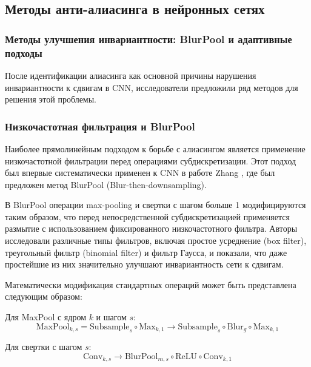 \subsection{Методы анти-алиасинга в нейронных сетях}
\label{sec:antialias}

\subsubsection{Методы улучшения инвариантности: BlurPool и адаптивные подходы}
\label{sec:antialias:blurpool_and_adaptive}

После идентификации алиасинга как основной причины нарушения инвариантности к сдвигам в CNN, исследователи предложили ряд методов для решения этой проблемы.

\subsubsection{Низкочастотная фильтрация и BlurPool}
\label{sec:antialias:blurpool}

Наиболее прямолинейным подходом к борьбе с алиасингом является применение низкочастотной фильтрации перед операциями субдискретизации. Этот подход был впервые систематически применен к CNN в работе Zhang \cite{Zhang2019}, где был предложен метод BlurPool (Blur-then-downsampling).

В BlurPool операции max-pooling и свертки с шагом больше 1 модифицируются таким образом, что перед непосредственной субдискретизацией применяется размытие с использованием фиксированного низкочастотного фильтра. Авторы исследовали различные типы фильтров, включая простое усреднение (box filter), треугольный фильтр (binomial filter) и фильтр Гаусса, и показали, что даже простейшие из них значительно улучшают инвариантность сети к сдвигам.

Математически модификация стандартных операций может быть представлена следующим образом:

Для MaxPool с ядром $k$ и шагом $s$:
\begin{equation}
\text{MaxPool}_{k,s} = \text{Subsample}_{s} \circ \text{Max}_{k,1} \longrightarrow \text{Subsample}_{s} \circ \text{Blur}_{g} \circ \text{Max}_{k,1}
\end{equation}

Для свертки с шагом $s$:
\begin{equation}
\text{Conv}_{k,s} \longrightarrow \text{BlurPool}_{m,s} \circ \text{ReLU} \circ \text{Conv}_{k,1}
\end{equation}


